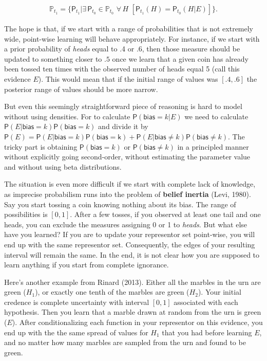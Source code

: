 \documentclass[
  letterpaper,
  DIV=11,
  numbers=noendperiod]{scrartcl}
\newcommand{\pr}[1]{\mathsf{P}(#1)}
\newcommand{\s}[1]{\mbox{$\mathsf{#1}$}}
\begin{document}
\begin{align*}
\mathbb{P}_{t_1} = \{\mathsf{P}_{t_1}\vert \exists\, {\mathsf{P}_{t_0} \!\in  \mathbb{P}_{t_0}}\,\, \forall\, {H}\,\, \left[\mathsf{P}_{t_1}(H)=\mathsf{P}_{t_0}(H \vert E)\right] \}.
\end{align*} \label{eq:updateRepresentor}

\noindent The hope is that, if we start with a range of probabilities
that is not extremely wide, point-wise learning will behave
appropriately. For instance, if we start with a prior probability of
\emph{heads} equal to .4 or .6, then those measure should be updated to
something closer to \(.5\) once we learn that a given coin has already
been tossed ten times with the observed number of heads equal 5 (call
this evidence \(E\)). This would mean that if the initial range of
values was \([.4,.6]\) the posterior range of values should be more
narrow.

But even this seemingly straightforward piece of reasoning is hard to
model without using densities. For to calculate
\(\pr{\s{bias} = k \vert E}\) we need to calculate
\(\pr{E \vert \s{bias} = k }\pr{\s{bias} = k}\) and divide it by
\(\pr{E} = \pr{E \vert \s{bias} = k }\pr{\s{bias = k}} + \pr{E \vert \s{bias} \neq k }\pr{ \s{bias} \neq k}\).
The tricky part is obtaining \(\pr{\s{bias} = k}\) or
\(\pr{ \s{bias} \neq k}\) in a principled manner without explicitly
going second-order, without estimating the parameter value and without
using beta distributions.

The situation is even more difficult if we start with complete lack of
knowledge, as imprecise probabilism runs into the problem of
\textbf{belief inertia} (Levi, 1980). Say you start tossing a coin
knowing nothing about its bias. The range of possibilities is \([0,1]\).
After a few tosses, if you observed at least one tail and one heads, you
can exclude the measures assigning 0 or 1 to \emph{heads}. But what else
have you learned? If you are to update your representor set point-wise,
you will end up with the same representor set. Consequently, the edges
of your resulting interval will remain the same. In the end, it is not
clear how you are supposed to learn anything if you start from complete
ignorance.

Here's another example from Rinard (2013). Either all the marbles in the
urn are green (\(H_1\)), or exactly one tenth of the marbles are green
(\(H_2\)). Your initial credence is complete uncertainty with interval
\([0,1]\) associated with each hypothesis. Then you learn that a marble
drawn at random from the urn is green (\(E\)). After conditionalizing
each function in your representor on this evidence, you end up with the
the same spread of values for \(H_1\) that you had before learning
\(E\), and no matter how many marbles are sampled from the urn and found
to be green.
\end{document}
